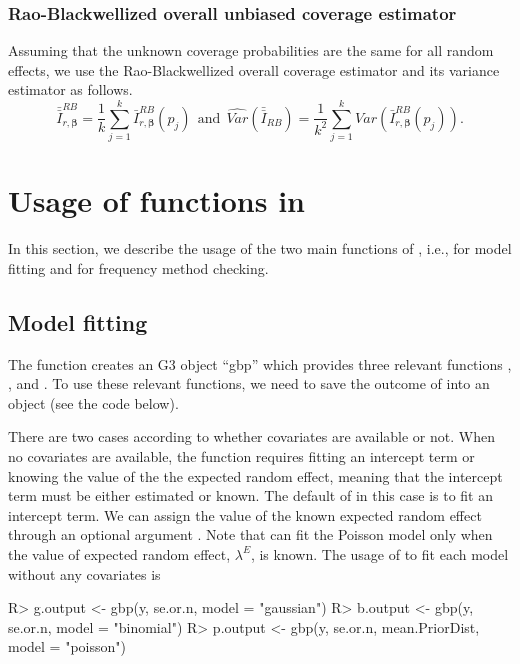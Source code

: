 \documentclass[article]{jss}
\begin{document}
\subsubsection{Rao-Blackwellized overall unbiased coverage estimator}\label{overallRB} Assuming that the unknown  coverage probabilities are the same for all random effects, we use the Rao-Blackwellized overall coverage estimator and its variance estimator as follows.
\begin{equation}\label{RBoverall}
\bar{\bar{I}}^{RB}_{r, \boldsymbol{\beta}} = \frac{1}{k}\sum_{j=1}^k\bar{I}^{RB}_{r, \boldsymbol{\beta}}(p_j)~~\textrm{and}~~ \widehat{Var}(\bar{\bar{I}}_{RB})=\frac{1}{k^2}\sum_{j=1}^k\widehat{Var}(\bar{I}^{RB}_{r, \boldsymbol{\beta}}(p_j)).
\end{equation}


\section[packageoverview]{Usage of functions in }\label{sec5}
In this section, we describe the usage of the two main functions of , i.e.,  for model fitting and  for frequency method checking. 

\subsection{Model fitting}
The function  creates an G3 object ``gbp'' which provides three relevant functions , , and . To use these relevant functions, we need to save the outcome of  into an object (see the code below).

There are two cases according to whether covariates are available or not. When no covariates are available, the function  requires fitting an intercept term  or knowing the value of the  the expected random effect, meaning that the intercept term must be either estimated or known. The default of  in this case is to fit an intercept term. We can assign the value of the known expected random effect through an optional argument . Note that  can fit the Poisson model only when the value of expected random effect, $\lambda^E$, is known. The usage of  to  fit each model without any covariates is 
\begin{CodeChunk}
\begin{CodeInput}
R> g.output <- gbp(y, se.or.n, model = "gaussian")
R> b.output <- gbp(y, se.or.n, model = "binomial")
R> p.output <- gbp(y, se.or.n, mean.PriorDist, model = "poisson")
\end{CodeInput}
\end{CodeChunk}
\end{document}
